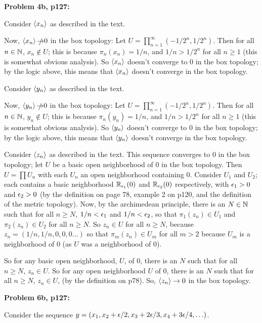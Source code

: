 \documentclass[a4paper,12pt]{article}
\begin{document}
\shunt

{\bf Problem 4b, p127:}


Consider $\left\langle x_n \right\rangle$ as described in the text. 

Now, $\left\langle x_n \right\rangle \slashed{\to} 0$ in the box topology: Let $U = \prod\limits_{n=1}^\infty (-1/2^n,1/2^n)$. Then for all $n \in \mathbb{N}$, $x_n \notin U$; this is because $\pi_n(x_n) = 1/n$, and $1/n > 1/2^n$ for all $n \geq 1$ (this is somewhat obvious analysis). So $\left\langle x_n \right\rangle$ doesn't converge to $0$ in the box topology; by the logic above, this means that $\left\langle x_n \right\rangle$ doesn't converge in the box topology.

Consider $\left\langle y_n \right\rangle$ as described in the text. 

Now, $\left\langle y_n \right\rangle \slashed{\to} 0$ in the box topology: Let $U = \prod\limits_{n=1}^\infty (-1/2^n,1/2^n)$. Then for all $n \in \mathbb{N}$, $y_n \notin U$; this is because $\pi_n(y_n) = 1/n$, and $1/n > 1/2^n$ for all $n \geq 1$ (this is somewhat obvious analysis). So $\left\langle y_n \right\rangle$ doesn't converge to $0$ in the box topology; by the logic above, this means that $\left\langle y_n \right\rangle$ doesn't converge in the box topology.

Consider $\left\langle z_n \right\rangle$ as described in the text. This sequence converges to $0$ in the box topology; let $U$ be a basic open neighborhood of $0$ in the box topology. Then $U = \prod U_n$ with each $U_n$ an open neighborhood containing $0$. Consider $U_1$ and $U_2$; each contains a basic neighborhood $\mathbb{R}_{\epsilon_1}(0)$ and $\mathbb{R}_{\epsilon_2}(0)$ respectively, with $\epsilon_1 >0$ and $\epsilon_2 >0$  (by the definition on page 78, example 2 on p120, and the definition of the metric topology). Now, by the archimedean principle, there is an $N \in \mathbb{N}$ such that for all $n \geq N$,  $1/n < \epsilon_1$ and $1/n < \epsilon_2$, so that $\pi_1(z_n) \in U_1$ and $\pi_2(z_n) \in U_2$ for all $n \geq N$. So $z_n \in U$ for all $n \geq N$, because $z_n = (1/n,1/n,0,0,0\ldots)$ so that $\pi_m(z_n) \in U_m$ for all $m > 2$ because $U_m$ is a neighborhood of $0$ (as $U$ was a neighborhood of $0$).

So for any basic open neighborhood, $U$, of $0$, there is an $N$ such that for all $n \geq N$, $z_n \in U$. So for any open neighborhood $U$ of $0$, there is an $N$ such that for all $n \geq N$, $z_n \in U$, (by the definition on p78). So, $\left\langle z_n \right\rangle \to 0$ in the box topology.

\shunt

{\bf Problem 6b, p127:}

Consider the sequence $y=(x_1,x_2+\epsilon/2, x_3 + 2\epsilon/3, x_4+ 3\epsilon/4, \ldots)$.
\end{document}
